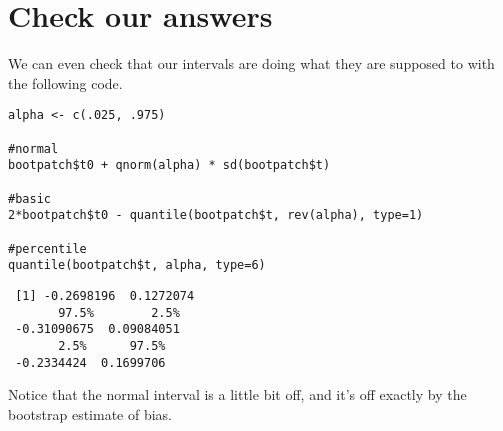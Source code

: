\documentclass[11pt,english]{article}
\begin{document}
\section*{Check our answers}
\label{sec-3}

We can even check that our intervals are doing what they are supposed to with the following code.

\begin{verbatim}
alpha <- c(.025, .975)

#normal
bootpatch$t0 + qnorm(alpha) * sd(bootpatch$t)

#basic
2*bootpatch$t0 - quantile(bootpatch$t, rev(alpha), type=1)

#percentile
quantile(bootpatch$t, alpha, type=6)
\end{verbatim}

\begin{verbatim}
 [1] -0.2698196  0.1272074
       97.5%        2.5% 
 -0.31090675  0.09084051
       2.5%      97.5% 
 -0.2334424  0.1699706
\end{verbatim}


Notice that the normal interval is a little bit off, and it's off exactly by the bootstrap estimate of bias.
\end{document}
